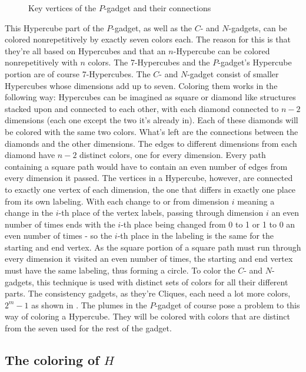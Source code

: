 \documentclass[12pt,a4paper]{article}
\begin{document}
\newline
\begin{figure}

\caption{Key vertices of the $P$-gadget and their connections}
\end{figure}
This Hypercube part of the $P$-gadget, as well as the $C$- and $N$-gadgets, can be colored nonrepetitively by exactly seven colors each. The reason for this is that they're all based on Hypercubes and that an $n$-Hypercube can be colored nonrepetitively with $n$ colors. The 7-Hypercubes and the $P$-gadget's Hypercube portion are of course 7-Hypercubes. The $C$- and $N$-gadget consist of smaller Hypercubes whose dimensions add up to seven. Coloring them works in the following way: Hypercubes can be imagined as square or diamond like structures stacked upon and connected to each other, with each diamond connected to $n-2$ dimensions (each one except the two it's already in). Each of these diamonds will be colored with the same two colors. What's left are the connections between the diamonds and the other dimensions. The edges to different dimensions from each diamond have $n-2$ distinct colors, one for every dimension. Every path containing a square path would have to contain an even number of edges from every dimension it passed. The vertices in a Hypercube, however, are connected to exactly one vertex of each dimension, the one that differs in exactly one place from its own labeling. With each change to or from dimension $i$ meaning a change in the $i$-th place of the vertex labels, passing through dimension $i$ an even number of times ends with the $i$-th place being changed from 0 to 1 or 1 to 0 an even number of times - so the $i$-th place in the labeling is the same for the starting and end vertex. As the square portion of a square path must run through every dimension it visited an even number of times, the starting and end vertex must have the same labeling, thus forming a circle. 
\newline
To color the $C$- and $N$-gadgets, this technique is used with distinct sets of colors for all their different parts. The consistency gadgets, as they're Cliques, each need a lot more colors, $2^m-1$ as shown in \citep{Alon2002}.
\newline
The plumes in the $P$-gadget of course pose a problem to this way of coloring a Hypercube. They will be colored with colors that are distinct from the seven used for the rest of the gadget.

\subsection{The coloring of $H$}
\end{document}
